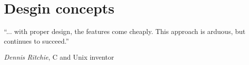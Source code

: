 \section{Desgin concepts}

``... with proper design, the features come cheaply. This approach is
arduous, but continues to succeed.''
\begin{flushright}
\emph{Dennis Ritchie}, C and Unix inventor
\end{flushright}


